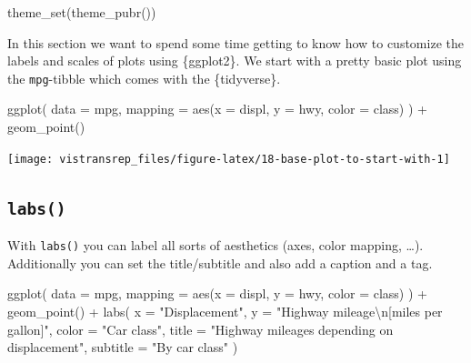 \documentclass[]{book}
\newenvironment{Shaded}{}{}
\newcommand{\CharTok}[1]{\textcolor[rgb]{0.00,0.50,0.50}{#1}}
\newcommand{\DataTypeTok}[1]{#1}
\newcommand{\KeywordTok}[1]{\textcolor[rgb]{0.00,0.00,1.00}{#1}}
\newcommand{\NormalTok}[1]{#1}
\newcommand{\OperatorTok}[1]{#1}
\newcommand{\StringTok}[1]{\textcolor[rgb]{0.00,0.50,0.50}{#1}}
\begin{document}
\begin{Shaded}
\begin{Highlighting}[]
\KeywordTok{theme_set}\NormalTok{(}\KeywordTok{theme_pubr}\NormalTok{())}
\end{Highlighting}
\end{Shaded}

In this section we want to spend some time getting to know how to customize the labels and scales of plots using \{ggplot2\}.
We start with a pretty basic plot using the \texttt{mpg}-tibble which comes with the \{tidyverse\}.

\begin{Shaded}
\begin{Highlighting}[]
\KeywordTok{ggplot}\NormalTok{(}
  \DataTypeTok{data =}\NormalTok{ mpg,}
  \DataTypeTok{mapping =} \KeywordTok{aes}\NormalTok{(}\DataTypeTok{x =}\NormalTok{ displ, }\DataTypeTok{y =}\NormalTok{ hwy, }\DataTypeTok{color =}\NormalTok{ class)}
\NormalTok{) }\OperatorTok{+}
\StringTok{  }\KeywordTok{geom_point}\NormalTok{()}
\end{Highlighting}
\end{Shaded}

\begin{flushright}\texttt{[image: vistransrep\_files/figure-latex/18-base-plot-to-start-with-1]} \end{flushright}

\hypertarget{labs}{%
\subsection{\texorpdfstring{\texttt{labs()}}{labs()}}\label{labs}}

With \texttt{labs()} you can label all sorts of aesthetics (axes, color mapping, \ldots{}).
Additionally you can set the title/subtitle and also add a caption and a tag.

\begin{Shaded}
\begin{Highlighting}[]
\KeywordTok{ggplot}\NormalTok{(}
  \DataTypeTok{data =}\NormalTok{ mpg,}
  \DataTypeTok{mapping =} \KeywordTok{aes}\NormalTok{(}\DataTypeTok{x =}\NormalTok{ displ, }\DataTypeTok{y =}\NormalTok{ hwy, }\DataTypeTok{color =}\NormalTok{ class)}
\NormalTok{) }\OperatorTok{+}
\StringTok{  }\KeywordTok{geom_point}\NormalTok{() }\OperatorTok{+}
\StringTok{  }\KeywordTok{labs}\NormalTok{(}
    \DataTypeTok{x =} \StringTok{"Displacement"}\NormalTok{,}
    \DataTypeTok{y =} \StringTok{"Highway mileage}\CharTok{\textbackslash{}n}\StringTok{[miles per gallon]"}\NormalTok{,}
    \DataTypeTok{color =} \StringTok{"Car class"}\NormalTok{,}
    \DataTypeTok{title =} \StringTok{"Highway mileages depending on displacement"}\NormalTok{,}
    \DataTypeTok{subtitle =} \StringTok{"By car class"}
\NormalTok{  )}
\end{Highlighting}
\end{Shaded}
\end{document}
